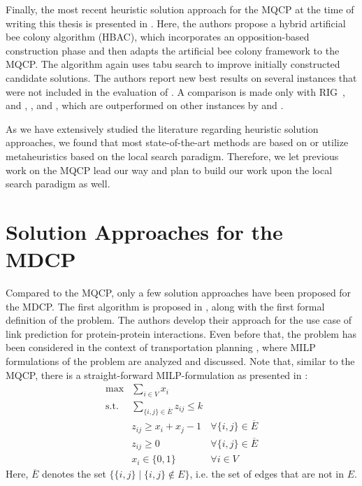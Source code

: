 \documentclass[draft,final]{vutinfth} %
\begin{document}
Finally, the most recent heuristic solution approach for the MQCP at the time of writing this thesis is presented in \cite{peng_solving_2021}. Here, the authors propose a hybrid artificial bee colony algorithm (HBAC), which incorporates an opposition-based construction phase and then adapts the artificial bee colony framework to the MQCP. The algorithm again uses tabu search to improve initially constructed candidate solutions. 
The authors report new best results on several instances that were not included in the evaluation of \cite{chen_nuqclq_2021}. A comparison is made only with RIG~\cite{oliveira2013construction}, and \cite{pinto2015biased}, \cite{pinto_biased_2018}, and \cite{pinto2021brkga}, which are outperformed on other instances by \cite{chen_nuqclq_2021} and \cite{zhou_opposition-based_2020}. 

As we have extensively studied the literature regarding heuristic solution approaches, we found that most state-of-the-art methods are based on or utilize metaheuristics based on the local search paradigm. Therefore, we let previous work on the MQCP lead our way and plan to build our work upon the local search paradigm as well. 

\section{Solution Approaches for the MDCP}\label{sec:mdcp-related-work}

Compared to the MQCP, only a few solution approaches have been proposed for the MDCP. 
The first algorithm is proposed in \cite{Yu2006}, along with the first formal definition of the problem. The authors develop their approach for the use case of link prediction for protein-protein interactions. Even before that, the problem has been considered in the context of transportation planning \cite{Sherali2002}, where MILP formulations of the problem are analyzed and discussed. 
Note that, similar to the MQCP, there is a straight-forward MILP-formulation as presented in \cite{Sherali2006}: 
\begin{align}
    \max & \sum_{i \in V} x_i &\\
    \text{s.t.} & \sum_{\{i,j\} \in \overline{E}} z_{ij} \leq k &\\
    & z_{ij} \geq x_i + x_j - 1 & \forall \{i,j\} \in \overline{E} \\
    & z_{ij} \geq 0 & \forall \{i,j\} \in \overline{E} \\
    & x_i \in \{0,1\} & \forall i \in V  
\end{align}
Here, $\overline{E}$ denotes the set $\{\{i,j\} \mid \{i,j\} \notin E\}$, i.e. the set of edges that are not in $E$. 
\end{document}

